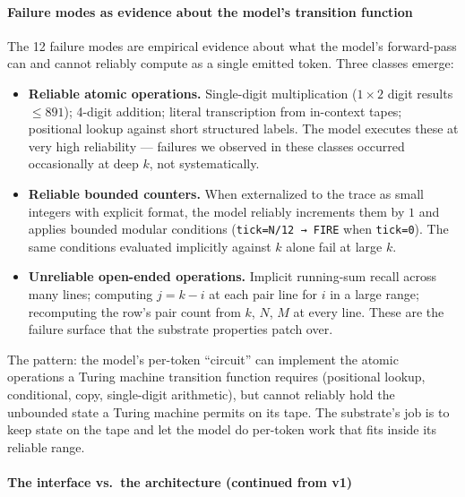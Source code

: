 \documentclass[twocolumn,switch,10pt]{article}
\providecommand{\tightlist}{\setlength{\itemsep}{0pt}\setlength{\parskip}{0pt}}
\begin{document}
\paragraph{Failure modes as evidence about the model's transition function}\label{failure-modes-as-evidence-about-the-models-transition-function}

The 12 failure modes are empirical evidence about what the model's
forward-pass can and cannot reliably compute as a single emitted
token. Three classes emerge:

\begin{itemize}
\tightlist
\item
  \textbf{Reliable atomic operations.} Single-digit multiplication
  (\(1 \times 2\) digit results \(\le 891\)); 4-digit addition; literal
  transcription from in-context tapes; positional lookup against
  short structured labels. The model executes these at very high
  reliability --- failures we observed in these classes occurred
  occasionally at deep \(k\), not systematically.
\item
  \textbf{Reliable bounded counters.} When externalized to the trace as
  small integers with explicit format, the model reliably increments
  them by \(1\) and applies bounded modular conditions
  (\texttt{tick=N/12\ →\ FIRE} when \texttt{tick=0}). The same conditions evaluated
  implicitly against \(k\) alone fail at large \(k\).
\item
  \textbf{Unreliable open-ended operations.} Implicit running-sum
  recall across many lines; computing \(j = k - i\) at each pair line
  for \(i\) in a large range; recomputing the row's pair count from
  \(k\), \(N\), \(M\) at every line. These are the failure surface that
  the substrate properties patch over.
\end{itemize}

The pattern: the model's per-token ``circuit'' can implement the
atomic operations a Turing machine transition function requires
(positional lookup, conditional, copy, single-digit arithmetic), but
cannot reliably hold the unbounded state a Turing machine permits
on its tape. The substrate's job is to keep state on the tape and
let the model do per-token work that fits inside its reliable range.

\paragraph{The interface vs.~the architecture (continued from v1)}\label{the-interface-vs.-the-architecture-continued-from-v1}
\end{document}

